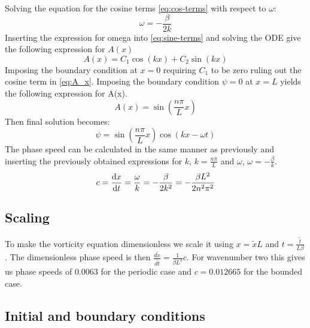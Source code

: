 Solving the equation for the cosine terms \cref{eq:cos-terms} with respect to
$\omega$:
\begin{equation}
    \omega = -\frac{\beta}{2k}
\end{equation}
Inserting the expression for omega into \cref{eq:sine-terms} and solving the ODE
give the following expression for $A(x)$
\begin{equation}\label{eq:A_x}
    A(x) = C_1 \cos{(kx) + C_2 \sin{(kx)}}
\end{equation}
Imposing the boundary condition at $x=0$ requiring $C_1$ to be zero ruling
out the cosine term in \cref{eq:A_x}. Imposing the boundary condition $\psi=0$
at $x=L$ yields the following expression for A(x).
\begin{equation}
    A(x) = \sin{\left(\frac{n\pi}{L} x \right)}
\end{equation}
Then final solution becomes:
\begin{equation}
    \psi = \sin{\left(\frac{n\pi}{L} x \right)} \cos{(kx - \omega t)}
\end{equation}
The phase speed can be calculated in the same manner as previously and inserting
the previously obtained expressions for $k$, $k=\frac{n\pi}{L}$ and $\omega$,
$\omega = -\frac{\beta}{k}$.
\begin{equation}
    c = \dv{x}{t} = \frac{\omega}{k} = -\frac{\beta}{2k^2} = -\frac{\beta L^2}{2 n^2 \pi^2}
\end{equation}

\subsection{Scaling}

To make the vorticity equation dimensionless we scale it using $x = \tilde{x} L $ and $t = \frac{\tilde{t}}{L \beta}$. The dimensionless phase speed is then $\frac{d\tilde{x}}{d\tilde{t}} = \frac{1}{\beta L^2} c$. For wavenumber two this gives us phase speeds of
$0.0063$ for the periodic case and $c = 0.012665$ for the bounded case.


\subsection{Initial and boundary conditions}
